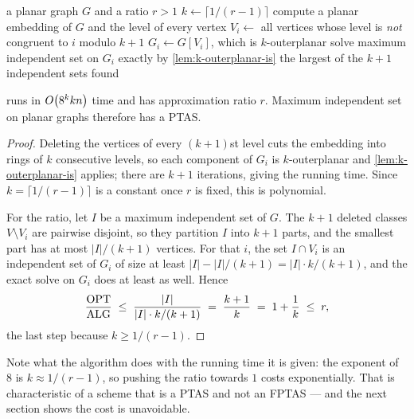 \begin{algorithm}[ht]
\caption{PTAS for maximum independent set on planar graphs}
\label{alg:planar-is-ptas}
\begin{algorithmic}[1]
  \Require a planar graph $G$ and a ratio $r > 1$
  \State $k \gets \lceil 1/(r-1) \rceil$
  \State compute a planar embedding of $G$ and the level of every vertex
    \State $V_i \gets$ all vertices whose level is \emph{not} congruent to $i$
           modulo $k+1$
    \State $G_i \gets G[V_i]$, which is $k$-outerplanar
    \State solve maximum independent set on $G_i$ exactly by
           \cref{lem:k-outerplanar-is}
  \EndFor
  \State \Return the largest of the $k+1$ independent sets found
\end{algorithmic}
\end{algorithm}

\begin{theorem}\label{thm:planar-is-ptas}
 runs in $O\!\left(8^k k n\right)$ time and has approximation
ratio $r$. Maximum independent set on planar graphs therefore has a PTAS.
\end{theorem}

\begin{proof}
Deleting the vertices of every $(k+1)$st level cuts the embedding into rings of
$k$ consecutive levels, so each component of $G_i$ is $k$-outerplanar and
\cref{lem:k-outerplanar-is} applies; there are $k+1$ iterations, giving the
running time. Since $k = \lceil 1/(r-1)\rceil$ is a constant once $r$ is fixed,
this is polynomial.

For the ratio, let $I$ be a maximum independent set of $G$. The $k+1$ deleted
classes $V \setminus V_i$ are pairwise disjoint, so they partition $I$ into
$k+1$ parts, and the smallest part has at most $|I|/(k+1)$ vertices. For that
$i$, the set $I \cap V_i$ is an independent set of $G_i$ of size at least
$|I| - |I|/(k+1) = |I| \cdot k/(k+1)$, and the exact solve on $G_i$ does at
least as well. Hence
\[ \frac{\mathrm{OPT}}{\mathrm{ALG}} \;\le\; \frac{|I|}{|I| \cdot k/(k+1)}
   \;=\; \frac{k+1}{k} \;=\; 1 + \frac1k \;\le\; r, \]
the last step because $k \ge 1/(r-1)$.
\end{proof}

Note what the algorithm does with the running time it is given: the exponent of
$8$ is $k \approx 1/(r-1)$, so pushing the ratio towards $1$ costs
exponentially. That is characteristic of a scheme that is a PTAS and not an
FPTAS --- and the next section shows the cost is unavoidable.

